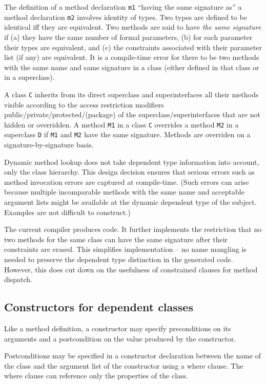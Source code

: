 The definition of a method declaration {\tt m1} ``having the same
signature as'' a method declaration {\tt m2} involves identity of
types. Two \Xten{} types are defined to be identical iff they are
equivalent.  Two methods are said to have {\em the same signature} if
(a) they have the same number of formal parameters, (b) for each
parameter their types are equivalent, and (c) the constraints
associated with their parameter list (if any) are equivalent.  It is a
compile-time error for there to be two methods with the same name and
same signature in a class (either defined in that class or in a
superclass).

A class {\tt C} inherits from its direct superclass and
superinterfaces all their methods visible according to the access
restriction modifiers public/private/protected/(package) of the
superclass/superinterfaces that are not hidden or overridden. A method
{\tt M1} in a class {\tt C} overrides a method {\tt M2} in a
superclass {\tt D} if {\tt M1} and {\tt M2} have the same signature.
Methods are overriden on a signature-by-signature basis.

Dynamic method lookup does not take dependent type information into
account, only the class hierarchy. This design decision ensures that
serious errors such as method invocation errors are captured at
compile-time. (Such errors can arise because multiple incomparable
methods with the same name and acceptable argument lists might be
available at the dynamic dependent type of the subject. Examples are
not difficult to construct.)

The current \Xten{} compiler produces \Java{} code. It further
implements the restriction that no two methods for the same class can
have the same signature after their constraints are erased. This
simplifies implementation -- no name mangling is needed to preserve
the dependent type distinction in the generated \Java{} code. However, this does cut down on the usefulness of constrained clauses for method dispatch.

\subsection{Constructors for dependent classes}

Like a method definition,
a constructor may
specify preconditions on its arguments
and a postcondition on the value produced by the constructor.

Postconditions may be specified in a constructor declaration between
the name of the class and the argument list of the constructor using a
where clause. The where clause can reference only the properties of
the class.

